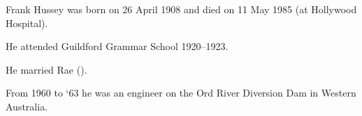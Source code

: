 
Frank Hussey was born on 26 April 1908 and died on 11 May 1985 (at Hollywood Hospital).

He attended Guildford Grammar School 1920--1923.\cite{FBHguildford}

\cite{FBHwar}

He married Rae ().

From 1960 to `63 he was an engineer on the Ord River Diversion Dam in Western Australia.
